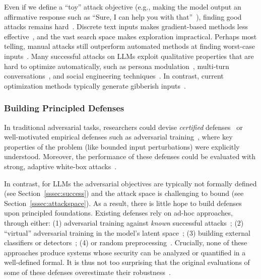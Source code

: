 Even if we define a ``toy'' attack objective (e.g., making the model output an affirmative response such as ``Sure, I can help you with that''~\citep{zou2023universal}), finding good attacks remains hard~\citep{carlini2024aligned}. Discrete text inputs makes gradient-based methods less effective~\citep{carlini2024aligned,rando2024gradient}, and the vast search space makes exploration impractical. Perhaps most telling, manual attacks still outperform automated methods at finding worst-case inputs~\citep{li2024llm}. Many successful attacks on LLMs exploit qualitative properties that are hard to optimize automatically, such as persona modulation~\citep{shah2023scalable}, multi-turn conversations~\citep{anil2024many}, and social engineering techniques~\citep{zeng2024johnny}. In contrast, current optimization methods typically generate gibberish inputs~\citep{zou2023universal,thompson2024flrt}.



\subsubsection{Building Principled Defenses}
\label{sssec:principleddefense}

In traditional adversarial tasks, researchers could devise \emph{certified} defenses~\citep{cohen2019certified} or well-motivated empirical defenses such as adversarial training~\citep{madry2017towards}, where key properties of the problem (like bounded input perturbations) were explicitly understood. Moreover, the performance of these defenses could be evaluated with strong, adaptive white-box attacks~\citep{tramer2020adaptive}. 

In contrast, for LLMs the adversarial objectives are typically not formally defined (see Section~\ref{sssec:success}) and the attack space is challenging to bound (see Section~\ref{sssec:attackspace}). 
As a result, there is little hope to build defenses upon principled foundations. Existing defenses rely on ad-hoc approaches, through either:  (1) adversarial training against \emph{known} successful attacks~\cite{bai2022training, wallace2024instruction}; (2) ``virtual'' adversarial training in the model's latent space~\cite{miyato2018virtual, casper2024defending,sheshadri2024latent}; (3) building external classifiers or detectors~\citep{inan2023llama}; (4) or random preprocessing~\citep{robey2023smoothllm}.
Crucially, none of these approaches  produce systems whose security can be analyzed or quantified in a well-defined formal. It is thus not too surprising that the original evaluations of some of these defenses overestimate their robustness~\citep{chi2024llama, qi2024evaluating, lucki2024adversarial}.

